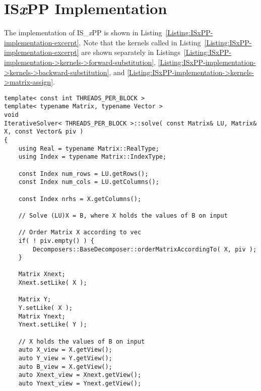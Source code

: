 \chapter{IS\textit{x}PP Implementation}\label{Appendix:ISxPP-implementation}
The implementation of IS\_\textit{x}PP is shown in Listing~\ref{Listing:ISxPP-implementation-excerpt}. Note that the kernels called in Listing~\ref{Listing:ISxPP-implementation-excerpt} are shown separately in Listings~\ref{Listing:ISxPP-implementation->kernels->forward-substitution}, \ref{Listing:ISxPP-implementation->kernels->backward-substitution}, and \ref{Listing:ISxPP-implementation->kernels->matrix-assign}.

\begin{lstlisting}[caption={Excerpt from the implementation of IS\_\textit{x}PP. The code has been slightly modified for brevity, for example, the checks for appropriate sizing of matrices and vectors have been removed. Note that the CUDA thread blocks used in the implementation are larger in the 1st dimension. Threads adjacent in the 1st dimension are assigned to neighboring elements in the same column since the matrices are stored in column-major order on the GPU. In other words, to mitigate misaligned global memory access, the 1st dimension of threads is used to access elements in a single column and the 2nd dimension is used to differentiate between right-hand sides.},label={Listing:ISxPP-implementation-excerpt}]
template< const int THREADS_PER_BLOCK >
template< typename Matrix, typename Vector >
void
IterativeSolver< THREADS_PER_BLOCK >::solve( const Matrix& LU, Matrix& X, const Vector& piv )
{
	using Real = typename Matrix::RealType;
	using Index = typename Matrix::IndexType;
	
	const Index num_rows = LU.getRows();
	const Index num_cols = LU.getColumns();
	
	const Index nrhs = X.getColumns();
	
	// Solve (LU)X = B, where X holds the values of B on input
	
	// Order Matrix X according to vec
	if( ! piv.empty() ) {
		Decomposers::BaseDecomposer::orderMatrixAccordingTo( X, piv );
	}
	
	Matrix Xnext;
	Xnext.setLike( X );
	
	Matrix Y;
	Y.setLike( X );
	Matrix Ynext;
	Ynext.setLike( Y );
	
	// X holds the values of B on input
	auto X_view = X.getView();
	auto Y_view = Y.getView();
	auto B_view = X.getView();
	auto Xnext_view = Xnext.getView();
	auto Ynext_view = Ynext.getView();
	

\end{lstlisting}
